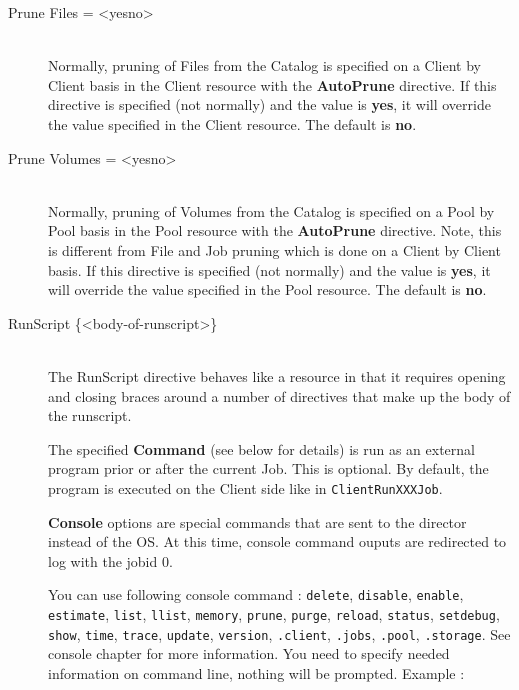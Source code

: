 \begin{description}
\item [Prune Files = {\textless}yes{\textbar}no{\textgreater}] \hfill \\
Normally, pruning of Files from the Catalog is specified on a Client by
Client basis in the Client resource with the {\bf AutoPrune} directive.
If this directive is specified (not normally) and the value is {\bf
yes}, it will override the value specified in the Client resource.  The
default is {\bf no}.

\item [Prune Volumes = {\textless}yes{\textbar}no{\textgreater}] \hfill \\
Normally, pruning of Volumes from the Catalog is specified on a Pool by
Pool basis in the Pool resource with the {\bf AutoPrune} directive.
Note, this is different from File and Job pruning which is done on a
Client by Client basis.  If this directive is specified (not normally)
and the value is {\bf yes}, it will override the value specified in the
Pool resource.  The default is {\bf no}.

\item [RunScript \{{\textless}body-of-runscript{\textgreater}\}] \hfill \\
The RunScript directive behaves like a resource in that it
requires opening and closing braces around a number of directives
that make up the body of the runscript.

The specified {\bf Command} (see below for details) is run as an external
program prior or after the current Job.  This is optional.  By default, the
program is executed on the Client side like in \texttt{ClientRunXXXJob}.

\textbf{Console} options are special commands that are sent to the director instead
of the OS. At this time, console command ouputs are redirected to log with
the jobid 0.

You can use following console command : \texttt{delete}, \texttt{disable},
\texttt{enable}, \texttt{estimate}, \texttt{list}, \texttt{llist},
\texttt{memory}, \texttt{prune}, \texttt{purge}, \texttt{reload},
\texttt{status}, \texttt{setdebug}, \texttt{show}, \texttt{time},
\texttt{trace}, \texttt{update}, \texttt{version}, \texttt{.client},
\texttt{.jobs}, \texttt{.pool}, \texttt{.storage}.  See console chapter for
more information. You need to specify needed information on command line, nothing
will be prompted. Example :


\end{description}
